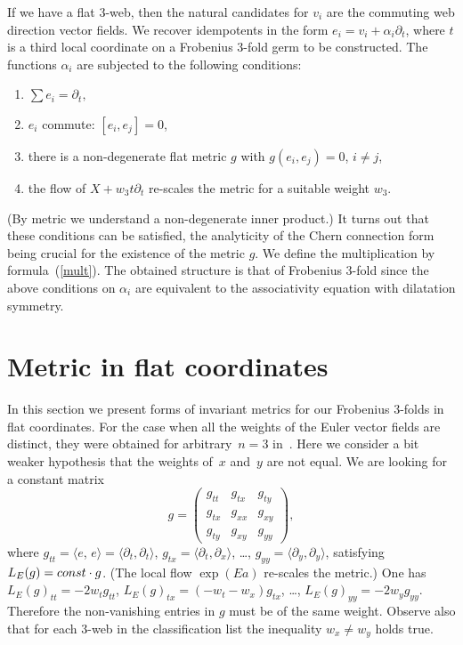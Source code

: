\documentclass[11pt]{article}
\begin{document}
If we have a f\/lat $3$-web, then the natural candidates for $v_i$ are the commuting web direction vector f\/ields. We recover idempotents in the form $e_i=v_i+\alpha_i\partial_t$, where $t$ is a third local coordinate on a Frobenius $3$-fold germ to be constructed.
The functions $\alpha_i$ are subjected to the following conditions:
\begin{enumerate}\itemsep=0pt
\item[1)] $\sum e_i=\partial_t,$
\item[2)] $e_i$ commute: $[e_i,e_j]=0$,
\item[3)] there is a non-degenerate f\/lat metric $g$ with $g(e_i,e_j)=0$, $i\ne j$,
\item[4)] the f\/low of $X+w_3t\partial_t$ re-scales the metric for a suitable weight $w_3$.
\end{enumerate}
(By metric we understand a non-degenerate inner product.)
It turns out that these conditions can be satisf\/ied, the analyticity of the Chern connection form being crucial for the existence of the metric $g$.
We def\/ine the multiplication by formula~(\ref{mult}). The obtained structure is that of Frobenius $3$-fold since the above conditions on $\alpha_i$ are equivalent to the associativity equation with dilatation symmetry.
\setcounter{section}{2}
\setcounter{subsection}{0}
\setcounter{subsubsection}{0}
\setcounter{equation}{2}
\section{Metric in f\/lat coordinates}
In this section we present forms of invariant metrics for our Frobenius $3$-folds in f\/lat coordinates.
For the case when all the weights of the Euler vector f\/ields are distinct,
they were obtained for arbitrary~$n=3$ in~\cite{Df}.
Here we consider a bit weaker hypothesis that the weights of~$x$ and~$y$ are not equal.
We are looking for a constant matrix
\[g=
\begin{pmatrix}
g_{tt}&g_{tx}&g_{ty}\\
g_{tx}&g_{xx}&g_{xy}\\
g_{ty}&g_{xy}&g_{yy}
\end{pmatrix},
\]
where $g_{tt}=\langle e$, $e\rangle=\langle\partial_t,\partial_t\rangle$,
$g_{tx}=\langle\partial_t,\partial_x\rangle $, \dots, $g_{yy}=\langle\partial_y,\partial_y\rangle $, satisfying
$L_E(g)={\rm const}\cdot g$. (The local f\/low $\exp(Ea)$ re-scales the metric.)
One has $L_E(g)_{tt}=-2w_tg_{tt}$, $L_E(g)_{tx}=(-w_t-w_x)g_{tx}$, \dots, $L_E(g)_{yy}=-2w_yg_{yy}$.
Therefore the non-vanishing entries in $g$ must be of the same weight.
Observe also that for each $3$-web in the classif\/ication list the inequality $w_x\ne w_y$ holds true.
\end{document}
